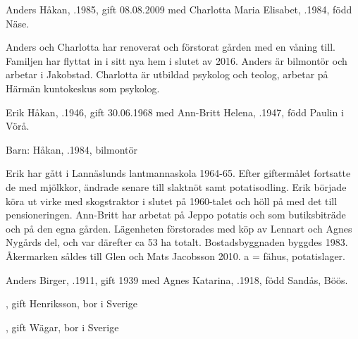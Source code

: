


Anders Håkan, .1985, gift 08.08.2009 med Charlotta Maria Elisabet, .1984, född Näse.
\begin{jhchildren}
  \item {}
  \item {}
\end{jhchildren}
Anders och Charlotta har renoverat och förstorat gården med en våning till. Familjen har flyttat in i sitt nya hem i slutet av 2016. Anders är bilmontör och arbetar i Jakobstad. Charlotta är utbildad psykolog och teolog, arbetar på Härmän kuntokeskus som psykolog.


Erik Håkan, .1946, gift 30.06.1968 med Ann-Britt Helena, .1947, född Paulin i Vörå.

Barn:  Håkan, .1984,  bilmontör

Erik har gått i Lannäslunds lantmannaskola 1964-65. Efter giftermålet fortsatte de med mjölkkor, ändrade senare till slaktnöt samt potatisodling. Erik började köra ut virke med skogstraktor i slutet på 1960-talet och höll på med det till pensioneringen. Ann-Britt har arbetat på Jeppo potatis och som butiksbiträde och på den egna gården. Lägenheten förstorades med köp av Lennart och Agnes Nygårds del, och var därefter ca 53 ha totalt. Bostadsbyggnaden byggdes 1983. Åkermarken såldes till Glen och Mats Jacobsson 2010. a = fähus, potatislager.






Anders Birger, .1911, gift 1939 med Agnes Katarina, .1918, född Sandås, Böös.
\begin{jhchildren}
  \item {}, gift Henriksson, bor i Sverige
  \item {}, gift Wägar, bor i Sverige
  \item {}
\end{jhchildren}

